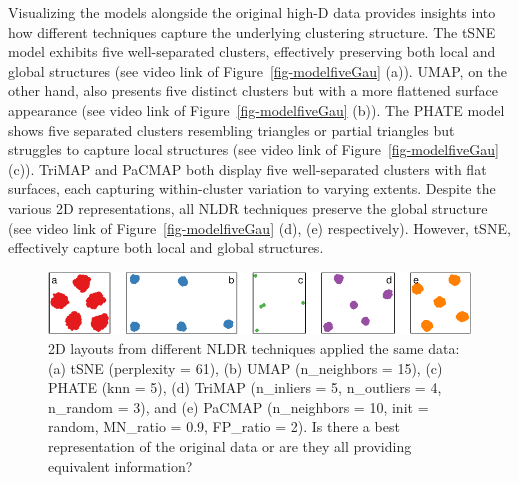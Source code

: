 \documentclass[
  12pt]{article}
\begin{document}
Visualizing the models alongside the original high-D data provides
insights into how different techniques capture the underlying clustering
structure. The tSNE model exhibits five well-separated clusters,
effectively preserving both local and global structures (see video link
of Figure~\ref{fig-modelfiveGau} (a)). UMAP, on the other hand, also
presents five distinct clusters but with a more flattened surface
appearance (see video link of Figure~\ref{fig-modelfiveGau} (b)). The
PHATE model shows five separated clusters resembling triangles or
partial triangles but struggles to capture local structures (see video
link of Figure~\ref{fig-modelfiveGau} (c)). TriMAP and PaCMAP both
display five well-separated clusters with flat surfaces, each capturing
within-cluster variation to varying extents. Despite the various 2D
representations, all NLDR techniques preserve the global structure (see
video link of Figure~\ref{fig-modelfiveGau} (d), (e) respectively).
However, tSNE, effectively capture both local and global structures.

\begin{figure}

{\centering \includegraphics[width=1\textwidth,height=\textheight]{paper_files/figure-pdf/fig-nldervis5Gau-1.pdf}

}

\caption{\label{fig-nldervis5Gau}2D layouts from different NLDR
techniques applied the same data: (a) tSNE (perplexity = 61), (b) UMAP
(n\_neighbors = 15), (c) PHATE (knn = 5), (d) TriMAP (n\_inliers = 5,
n\_outliers = 4, n\_random = 3), and (e) PaCMAP (n\_neighbors = 10, init
= random, MN\_ratio = 0.9, FP\_ratio = 2). Is there a best
representation of the original data or are they all providing equivalent
information?}

\end{figure}
\end{document}

